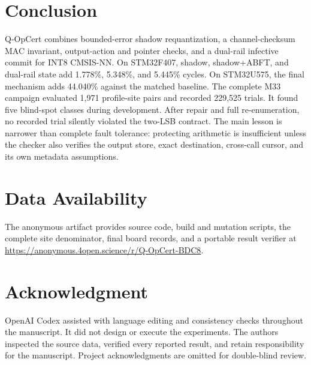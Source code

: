 \documentclass[conference]{IEEEtran}
\begin{document}
\section{Conclusion}
Q-OpCert combines bounded-error shadow requantization, a channel-checksum MAC invariant, output-action and pointer checks, and a dual-rail infective commit for INT8 CMSIS-NN. On STM32F407, shadow, shadow+ABFT, and dual-rail state add 1.778\%, 5.348\%, and 5.445\% cycles. On STM32U575, the final mechanism adds 44.040\% against the matched baseline. The complete M33 campaign evaluated 1,971 profile-site pairs and recorded 229,525 trials. It found five blind-spot classes during development. After repair and full re-enumeration, no recorded trial silently violated the two-LSB contract. The main lesson is narrower than complete fault tolerance: protecting arithmetic is insufficient unless the checker also verifies the output store, exact destination, cross-call cursor, and its own metadata assumptions.

\section*{Data Availability}
The anonymous artifact provides source code, build and mutation scripts, the complete site denominator, final board records, and a portable result verifier at \url{https://anonymous.4open.science/r/Q-OpCert-BDC8}.

\section*{Acknowledgment}
OpenAI Codex assisted with language editing and consistency checks throughout the manuscript. It did not design or execute the experiments. The authors inspected the source data, verified every reported result, and retain responsibility for the manuscript. Project acknowledgments are omitted for double-blind review.



\end{document}
